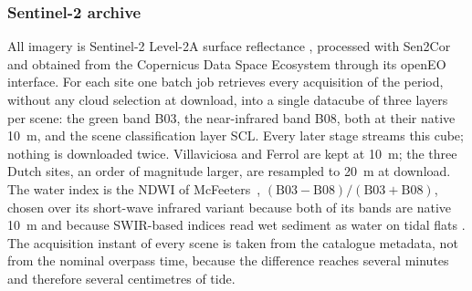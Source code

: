 \documentclass[final,5p,times,number]{elsarticle}
\begin{document}
\begin{table}[t]
\centering
\caption{Study sites. Cubes are Sentinel-2 L2A datacubes at the stated
resolution; scenes are all acquisitions in the period, before cloud
screening. Intertidal pixels are those with water frequency between 0.10
and 0.90 and at least 30 clear observations. The judge's distance is the
geodesic distance through the water from the sea edge of the site.}
\label{tab:sites}
\footnotesize
\setlength{\tabcolsep}{4pt}
\end{table}

\subsubsection{Sentinel-2 archive}

All imagery is Sentinel-2 Level-2A surface reflectance \citep{drusch2012},
processed with Sen2Cor \citep{mainknorn2017} and obtained from the
Copernicus Data Space Ecosystem through its openEO interface. For each
site one batch job retrieves every acquisition of the period, without any
cloud selection at download, into a single datacube of three layers per
scene: the green band B03, the near-infrared band B08, both at their
native 10~m, and the scene classification layer SCL. Every later stage
streams this cube; nothing is downloaded twice. Villaviciosa and Ferrol
are kept at 10~m; the three Dutch sites, an order of magnitude larger,
are resampled to 20~m at download. The water index is the NDWI of
McFeeters~\cite{mcfeeters1996}, $(\mathrm{B03}-\mathrm{B08})/(\mathrm{B03}+\mathrm{B08})$,
chosen over its short-wave infrared variant \citep{xu2006} because both
of its bands are native 10~m and because SWIR-based indices read wet
sediment as water on tidal flats
\citep{bishoptaylor2019waterline,bishoptaylor2026}. The acquisition
instant of every scene is taken from the catalogue metadata, not from the
nominal overpass time, because the difference reaches several minutes and
therefore several centimetres of tide.
\end{document}
